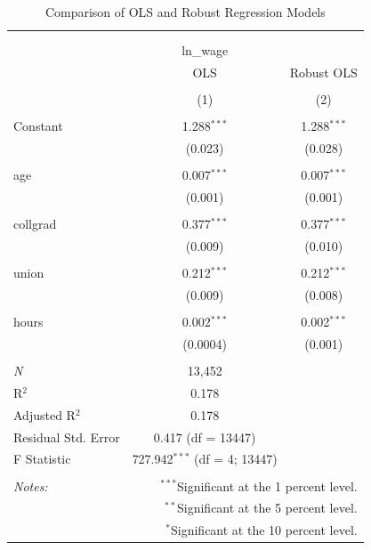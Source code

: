 \documentclass[
]{article}
\begin{document}
\begin{table}[!htbp] \centering 
  \caption{Comparison of OLS and Robust Regression Models} 
  \label{} 
\begin{tabular}{@{\extracolsep{5pt}}lcc} 
\\[-1.8ex]\hline 
\hline \\[-1.8ex] 
\\[-1.8ex] & ln\_wage &   \\ 
 & OLS & Robust OLS \\ 
\\[-1.8ex] & (1) & (2)\\ 
\hline \\[-1.8ex] 
 Constant & 1.288$^{***}$ & 1.288$^{***}$ \\ 
  & (0.023) & (0.028) \\ 
  & & \\ 
 age & 0.007$^{***}$ & 0.007$^{***}$ \\ 
  & (0.001) & (0.001) \\ 
  & & \\ 
 collgrad & 0.377$^{***}$ & 0.377$^{***}$ \\ 
  & (0.009) & (0.010) \\ 
  & & \\ 
 union & 0.212$^{***}$ & 0.212$^{***}$ \\ 
  & (0.009) & (0.008) \\ 
  & & \\ 
 hours & 0.002$^{***}$ & 0.002$^{***}$ \\ 
  & (0.0004) & (0.001) \\ 
  & & \\ 
\textit{N} & 13,452 &  \\ 
R$^{2}$ & 0.178 &  \\ 
Adjusted R$^{2}$ & 0.178 &  \\ 
Residual Std. Error & 0.417 (df = 13447) &  \\ 
F Statistic & 727.942$^{***}$ (df = 4; 13447) &  \\ 
\hline 
\hline \\[-1.8ex] 
\textit{Notes:} & \multicolumn{2}{r}{$^{***}$Significant at the 1 percent level.} \\ 
 & \multicolumn{2}{r}{$^{**}$Significant at the 5 percent level.} \\ 
 & \multicolumn{2}{r}{$^{*}$Significant at the 10 percent level.} \\ 
\end{tabular} 
\end{table}
\end{document}
